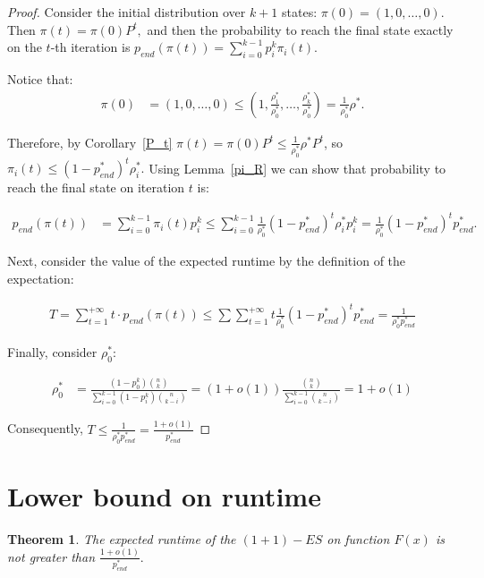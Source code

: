 \documentclass{article}
\newtheorem{theorem}{Theorem}
\begin{document}
\begin{proof}
Consider the initial distribution over $k + 1$ states: $\pi(0) = (1, 0, \dots, 0).$
Then $\pi(t) = \pi(0) P^t,$ and then the probability to reach the final state exactly on the $t$-th iteration is $p_{end}(\pi(t)) = \sum\limits_{i = 0}^{k - 1} p_i^k \pi_i(t).$

Notice that:
\begin{align*}
\pi(0) &= (1, 0, \dots, 0) \le (1, \frac{\rho_1^*}{\rho_0^*}, \dots, \frac{\rho_k^*}{\rho_0^*}) = \frac{1}{\rho_0^*} \rho^*.
\end{align*}

Therefore, by Corollary~\ref{P_t} $\pi(t) = \pi(0) P^t \le \frac{1}{\rho_0^*} \rho^* P^t$, so $\pi_i(t) \le (1 - p_{end}^*)^t \rho_i^*.$ Using Lemma~\ref{pi_R} we can show that probability to reach the final state on iteration $t$ is:

\begin{align*}
p_{end}(\pi(t)) &= \sum\limits_{i = 0}^{k - 1} \pi_i(t) p_i^k \le \sum\limits_{i = 0}^{k - 1} \frac{1}{\rho_0^*}(1 - p_{end}^*)^t \rho_i^* p_i^k = \frac{1}{\rho_0^*} (1 - p_{end}^*)^t p_{end}^*.
\end{align*}

Next, consider the value of the expected runtime by the definition of the expectation:

\begin{align*}
  T = \sum\limits_{t = 1}^{+\infty} t \cdot p_{end}(\pi(t)) \le \sum\sum\limits_{t = 1}^{+\infty} t \frac{1}{\rho_0^*} (1 - p_{end}^*)^t p_{end}^* = \frac{1}{\rho_0^* p_{end}^*}
\end{align*}

Finally, consider $\rho_0^*:$

\begin{align*}
  \rho_0^* &= \frac{(1 - p_0^k)\binom{n}{k}}{\sum\limits_{i = 0}^{k - 1}(1 - p_i^k)\binom{n}{k - i}} = (1 + o(1)) \frac{\binom{n}{k}}{\sum\limits_{i = 0}^{k - 1} \binom{n}{k - i}}
  = 1 + o(1)
\end{align*}

Consequently, $T \le \frac{1}{\rho_0^* p_{end}^*} = \frac{1 + o(1)}{p_{end}^*}$
\end{proof}

\section{Lower bound on runtime}

\begin{theorem}\label{th_lo}
  The expected runtime of the $(1 + 1)-ES$ on function $F(x)$ is not greater than $\frac{1 + o(1)}{p_{end}^*}.$
\end{theorem}
\end{document}
